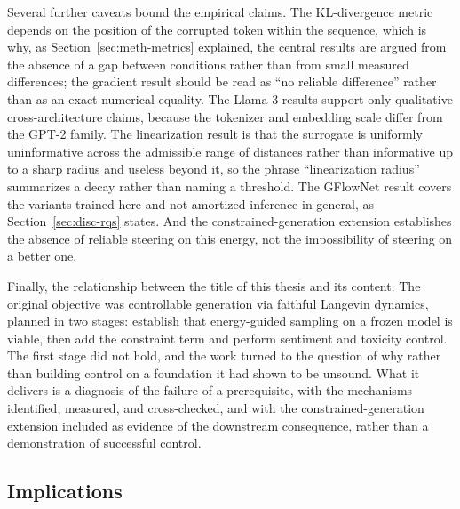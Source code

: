 Several further caveats bound the empirical claims. The KL-divergence metric depends on the position of the corrupted token within the sequence, which is why, as Section~\ref{sec:meth-metrics} explained, the central results are argued from the absence of a gap between conditions rather than from small measured differences; the gradient result should be read as ``no reliable difference'' rather than as an exact numerical equality. The Llama-3 results support only qualitative cross-architecture claims, because the tokenizer and embedding scale differ from the GPT-2 family. The linearization result is that the surrogate is uniformly uninformative across the admissible range of distances rather than informative up to a sharp radius and useless beyond it, so the phrase ``linearization radius'' summarizes a decay rather than naming a threshold. The GFlowNet result covers the variants trained here and not amortized inference in general, as Section~\ref{sec:disc-rqs} states. And the constrained-generation extension establishes the absence of reliable steering on this energy, not the impossibility of steering on a better one.

Finally, the relationship between the title of this thesis and its content. The original objective was controllable generation via faithful Langevin dynamics, planned in two stages: establish that energy-guided sampling on a frozen model is viable, then add the constraint term and perform sentiment and toxicity control. The first stage did not hold, and the work turned to the question of why rather than building control on a foundation it had shown to be unsound. What it delivers is a diagnosis of the failure of a prerequisite, with the mechanisms identified, measured, and cross-checked, and with the constrained-generation extension included as evidence of the downstream consequence, rather than a demonstration of successful control.

\subsection{Implications}
\label{sec:disc-future}

